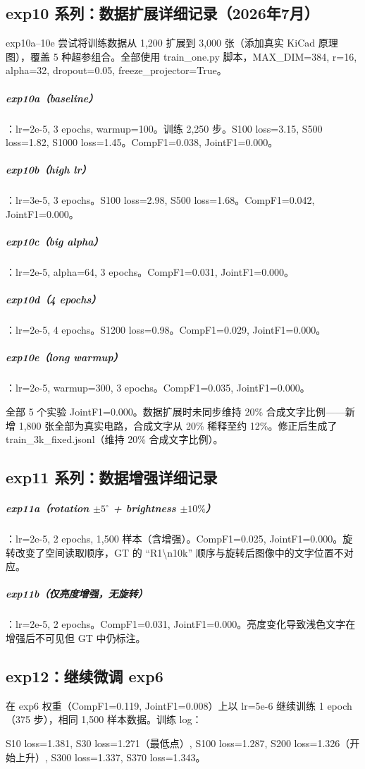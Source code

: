 \subsection{exp10 系列：数据扩展详细记录（2026年7月）}

exp10a--10e 尝试将训练数据从 1,200 扩展到 3,000 张（添加真实 KiCad 原理图），覆盖 5 种超参组合。全部使用 train\_one.py 脚本，MAX\_DIM=384, r=16, alpha=32, dropout=0.05, freeze\_projector=True。

\subparagraph{exp10a（baseline）}：lr=2e-5, 3 epochs, warmup=100。训练 2,250 步。S100 loss=3.15, S500 loss=1.82, S1000 loss=1.45。CompF1=0.038, JointF1=0.000。

\subparagraph{exp10b（high lr）}：lr=3e-5, 3 epochs。S100 loss=2.98, S500 loss=1.68。CompF1=0.042, JointF1=0.000。

\subparagraph{exp10c（big alpha）}：lr=2e-5, alpha=64, 3 epochs。CompF1=0.031, JointF1=0.000。

\subparagraph{exp10d（4 epochs）}：lr=2e-5, 4 epochs。S1200 loss=0.98。CompF1=0.029, JointF1=0.000。

\subparagraph{exp10e（long warmup）}：lr=2e-5, warmup=300, 3 epochs。CompF1=0.035, JointF1=0.000。

全部 5 个实验 JointF1=0.000。数据扩展时未同步维持 20\% 合成文字比例——新增 1,800 张全部为真实电路，合成文字从 20\% 稀释至约 12\%。修正后生成了 train\_3k\_fixed.jsonl（维持 20\% 合成文字比例）。

\subsection{exp11 系列：数据增强详细记录}

\subparagraph{exp11a（rotation $\pm5^\circ$ + brightness $\pm10\%$）}：lr=2e-5, 2 epochs, 1,500 样本（含增强）。CompF1=0.025, JointF1=0.000。旋转改变了空间读取顺序，GT 的 ``R1\textbackslash n10k'' 顺序与旋转后图像中的文字位置不对应。

\subparagraph{exp11b（仅亮度增强，无旋转）}：lr=2e-5, 2 epochs。CompF1=0.031, JointF1=0.000。亮度变化导致浅色文字在增强后不可见但 GT 中仍标注。

\subsection{exp12：继续微调 exp6}

在 exp6 权重（CompF1=0.119, JointF1=0.008）上以 lr=5e-6 继续训练 1 epoch（375 步），相同 1,500 样本数据。训练 log：

S10 loss=1.381, S30 loss=1.271（最低点）, S100 loss=1.287, S200 loss=1.326（开始上升）, S300 loss=1.337, S370 loss=1.343。

